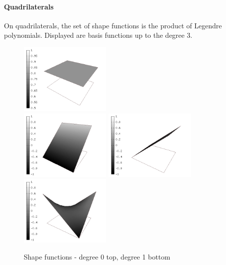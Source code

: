 \paragraph{Quadrilaterals}
On quadrilaterals, the set of shape functions is the product of Legendre polynomials. Displayed are basis functions up to the degree 3.
\begin{figure}[H]
\begin{center}
\includegraphics[width=4.4cm]{minor_examples/BasisFunctions001}
\\
\includegraphics[width=4.4cm]{minor_examples/BasisFunctions002}
\includegraphics[width=4.4cm]{minor_examples/BasisFunctions005}
\includegraphics[width=4.4cm]{minor_examples/BasisFunctions006}
\end{center}
\caption{Shape functions - degree 0 top, degree 1 bottom}
\vspace{-7mm}
\label{bubbleshape1q}
\end{figure}

